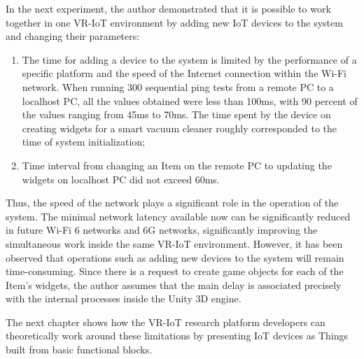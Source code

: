 In the next experiment, the author demonstrated that it is possible to work together in one VR-IoT environment by adding new IoT devices to the system and changing their parameters:
\begin{enumerate}
    \item The time for adding a device to the system is limited by the performance of a specific platform and the speed of the Internet connection within the Wi-Fi network. When running 300 sequential ping tests from a remote PC to a localhost PC, all the values ​​obtained were less than 100ms, with 90 percent of the values ranging from 45ms to 70ms. The time spent by the device on creating widgets for a smart vacuum cleaner roughly corresponded to the time of system initialization;
    \item Time interval from changing an Item on the remote PC to updating the widgets on localhost PC did not exceed 60ms.
\end{enumerate}

Thus, the speed of the network plays a significant role in the operation of the system. The minimal network latency available now can be significantly reduced in future Wi-Fi 6 networks and 6G networks, significantly improving the simultaneous work inside the same VR-IoT environment. However, it has been observed that operations such as adding new devices to the system will remain time-consuming. Since there is a request to create game objects for each of the Item's widgets, the author assumes that the main delay is associated precisely with the internal processes inside the Unity 3D engine.

The next chapter shows how the VR-IoT research platform developers can theoretically work around these limitations by presenting IoT devices as Things built from basic functional blocks.